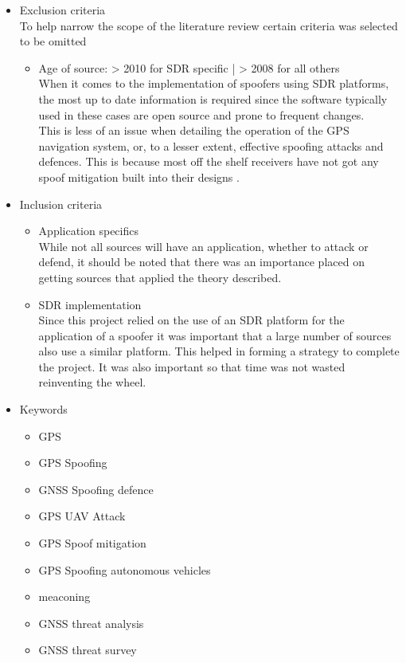 \begin{itemize}
    \item Exclusion criteria \\ To help narrow the scope of the literature review certain criteria was selected to be omitted
    \begin{itemize}
        \item Age of source: > 2010 for SDR specific | > 2008 for all others \\ When it comes to the implementation of spoofers using SDR platforms, the most up to date information is required since the software typically used in these cases are open source and prone to frequent changes.\\ This is less of an issue when detailing the operation of the GPS navigation system, or, to a lesser extent, effective spoofing attacks and defences. This is because most off the shelf receivers have not got any spoof mitigation built into their designs \cite{RN12}.
    \end{itemize}
    \item Inclusion criteria
    \begin{itemize}
        \item Application specifics \\ While not all sources will have an application, whether to attack or defend, it should be noted that there was an importance placed on getting sources that applied the theory described.
        \item SDR implementation \\ Since this project relied on the use of an SDR platform for the application of a spoofer it was important that a large number of sources also use a similar platform. This helped in forming a strategy to complete the project. It was also important so that time was not wasted reinventing the wheel.
    \end{itemize}
    \item Keywords
    \begin{itemize}
        \item GPS
        \item GPS Spoofing
        \item GNSS Spoofing defence
        \item GPS UAV Attack
        \item GPS Spoof mitigation
        \item GPS Spoofing autonomous vehicles
        \item meaconing
        \item GNSS threat analysis
        \item GNSS threat survey
    \end{itemize}
\end{itemize}

